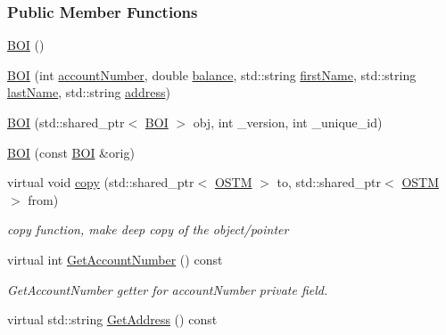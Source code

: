 \subsubsection*{Public Member Functions}
\begin{DoxyCompactItemize}
\item 
\hyperlink{class_b_o_i_a6af682a5f199a029681f0cb2b8658706_a6af682a5f199a029681f0cb2b8658706}{B\+OI} ()
\item 
\hyperlink{class_b_o_i_a1807bd07cad08109c974edbb2c32591c_a1807bd07cad08109c974edbb2c32591c}{B\+OI} (int \hyperlink{class_b_o_i_a35c9fd6e938eb44ad4e076bc6a736851_a35c9fd6e938eb44ad4e076bc6a736851}{account\+Number}, double \hyperlink{class_b_o_i_aa00a3d8baf3420647c40119b7fa4ed6f_aa00a3d8baf3420647c40119b7fa4ed6f}{balance}, std\+::string \hyperlink{class_b_o_i_a12872fd8c15dbf833f78862b00579ed1_a12872fd8c15dbf833f78862b00579ed1}{first\+Name}, std\+::string \hyperlink{class_b_o_i_ad51bfa6f28816c7f5036447ff809cecf_ad51bfa6f28816c7f5036447ff809cecf}{last\+Name}, std\+::string \hyperlink{class_b_o_i_ab9315fe76fd9f07551f5ae7899d33516_ab9315fe76fd9f07551f5ae7899d33516}{address})
\item 
\hyperlink{class_b_o_i_ae4263940f8ffdd40d5f01a714b20f791_ae4263940f8ffdd40d5f01a714b20f791}{B\+OI} (std\+::shared\+\_\+ptr$<$ \hyperlink{class_b_o_i}{B\+OI} $>$ obj, int \+\_\+version, int \+\_\+unique\+\_\+id)
\item 
\hyperlink{class_b_o_i_a7757de8d3ac656871bed4b07d77457ff_a7757de8d3ac656871bed4b07d77457ff}{B\+OI} (const \hyperlink{class_b_o_i}{B\+OI} \&orig)
\item 
virtual void \hyperlink{class_b_o_i_a9ff2d32c25c23a1bea6316f50c3bf677_a9ff2d32c25c23a1bea6316f50c3bf677}{copy} (std\+::shared\+\_\+ptr$<$ \hyperlink{class_o_s_t_m}{O\+S\+TM} $>$ to, std\+::shared\+\_\+ptr$<$ \hyperlink{class_o_s_t_m}{O\+S\+TM} $>$ from)
\begin{DoxyCompactList}\small\item\em copy function, make deep copy of the object/pointer \end{DoxyCompactList}\item 
virtual int \hyperlink{class_b_o_i_a5b18e1538f3d37835234946cdf9f240f_a5b18e1538f3d37835234946cdf9f240f}{Get\+Account\+Number} () const 
\begin{DoxyCompactList}\small\item\em Get\+Account\+Number getter for account\+Number private field. \end{DoxyCompactList}\item 
virtual std\+::string \hyperlink{class_b_o_i_a8920e1f47b22445ba954e86012207462_a8920e1f47b22445ba954e86012207462}{Get\+Address} () const 

\end{DoxyCompactItemize}
